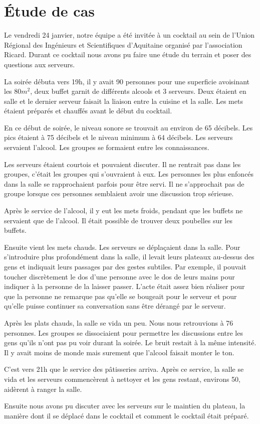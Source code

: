 \chapter{\'Etude de cas}

Le vendredi 24 janvier, notre équipe a été invitée à un cocktail au sein de l’Union Régional des Ingénieurs et Scientifiques d’Aquitaine organisé par l’association Ricard. Durant ce cocktail nous avons pu faire une étude du terrain et poser des questions aux serveurs.

La soirée débuta vers 19h, il y avait 90 personnes pour une superficie avoisinant les $80m^2$, deux buffet garnit de différents alcools et 3 serveurs. Deux étaient en salle et le dernier serveur faisait la liaison entre la cuisine et la salle. Les mets étaient préparés et chauffés avant le début du cocktail.

En ce début de soirée, le niveau sonore se trouvait au environ de 65 décibels. Les pics étaient à 75 décibels et le niveau minimum à 64 décibels. Les serveurs servaient l’alcool. Les groupes se formaient entre les connaissances.

Les serveurs étaient courtois et pouvaient discuter. Il ne rentrait pas dans les groupes, c’était les groupes qui s’ouvraient à eux. Les personnes les plus enfoncés dans la salle se rapprochaient parfois pour être servi. Il ne s’approchait pas de groupe lorsque ces personnes semblaient avoir une discussion trop sérieuse.

Après le service de l’alcool, il y eut les mets froids, pendant que les buffets ne servaient que de l’alcool. Il était possible de trouver deux poubelles sur les buffets.

Ensuite vient les mets chauds. Les serveurs se déplaçaient dans la salle. Pour s’introduire plus profondément dans la salle, il levait leurs plateaux au-dessus des gens et  indiquait leurs passages par des gestes subtiles. Par exemple, il pouvait toucher discrètement le dos d’une personne avec le dos de leurs mains pour indiquer à la personne de la laisser passer. L’acte était assez bien réaliser pour que la personne ne remarque pas qu’elle se bougeait pour le serveur et pour qu’elle puisse continuer sa conversation sans être dérangé par le serveur.

Après les plats chauds, la salle se vida un peu. Nous nous retrouvions à 76 personnes. Les groupes se dissociaient pour permettre les discussions entre les gens qu’ils n’ont pas pu voir durant la soirée. Le bruit restait à la même intensité. Il y avait moins de monde mais surement que l’alcool faisait monter le ton.

C’est vers 21h que le service des pâtisseries arriva. Après ce service, la salle se vida et les serveurs commencèrent à nettoyer et les gens restant, environs 50, aidèrent à ranger la salle.

Ensuite nous avons pu discuter avec les serveurs sur le maintien du plateau, la manière dont il se déplacé dans le cocktail et comment le cocktail était préparé. 
